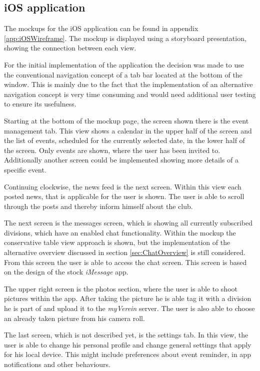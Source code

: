 \subsection{iOS application}
The mockups for the iOS application can be found in appendix \vref{app:iOSWireframe}. The mockup is displayed using a storyboard presentation, showing the connection between each view.

For the initial implementation of the application the decision was made to use the conventional navigation concept of a tab bar located at the bottom of the window. This is mainly due to the fact that the implementation of an alternative navigation concept is very time consuming and would need additional user testing to ensure its usefulness.

Starting at the bottom of the mockup page, the screen shown there is the event management tab. This view shows a calendar in the upper half of the screen and the list of events, scheduled for the currently selected date, in the lower half of the screen. Only events are shown, where the user has been invited to. Additionally another screen could be implemented showing more details of a specific event.

Continuing clockwise, the news feed is the next screen. Within this view each posted news, that is applicable for the user is shown. The user is able to scroll through the posts and thereby inform himself about the club.

The next screen is the messages screen, which is showing all currently subscribed divisions, which have an enabled chat functionality. Within the mockup the conservative table view approach is shown, but the implementation of the alternative overview discussed in section \vref{sec:ChatOverview} is still considered. From this screen the user is able to access the chat screen. This screen is based on the design of the stock \emph{iMessage} app.

The upper right screen is the photos section, where the user is able to shoot pictures within the app. After taking the picture he is able tag it with a division he is part of and upload it to the \emph{myVerein} server. The user is also able to choose an already taken picture from his camera roll.

The last screen, which is not described yet, is the settings tab. In this view, the user is able to change his personal profile and change general settings that apply for his local device. This might include preferences about event reminder, in app notifications and other behaviours.

